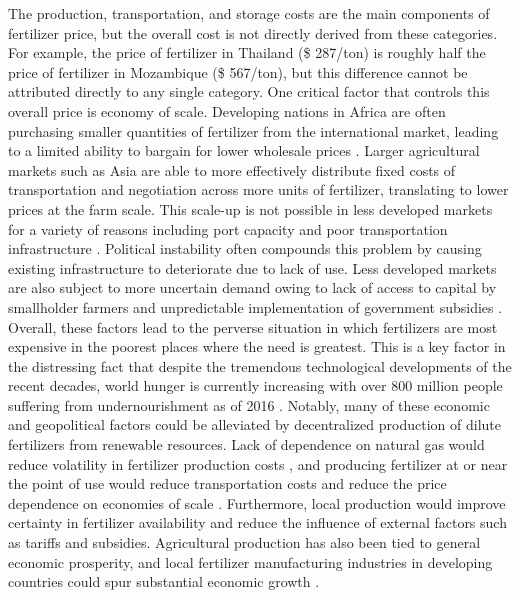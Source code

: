 The production, transportation, and storage costs are the main components of fertilizer price, but the overall cost is not directly derived from these categories. For example, the price of fertilizer in Thailand (\$ 287/ton) is roughly half the price of fertilizer in Mozambique (\$ 567/ton), but this difference cannot be attributed directly to any single category. One critical factor that controls this overall price is economy of scale. Developing nations in Africa are often purchasing smaller quantities of fertilizer from the international market, leading to a limited ability to bargain for lower wholesale prices \cite{Wanzala2013}. Larger agricultural markets such as Asia are able to more effectively distribute fixed costs of transportation and negotiation across more units of fertilizer, translating to lower prices at the farm scale. This scale-up is not possible in less developed markets for a variety of reasons including port capacity and poor transportation infrastructure \needcite. Political instability often compounds this problem by causing existing infrastructure to deteriorate due to lack of use\cite{Foster_2011}. Less developed markets are also subject to more uncertain demand owing to lack of access to capital by smallholder farmers and unpredictable implementation of government subsidies \needcite. Overall, these factors lead to the perverse situation in which fertilizers are most expensive in the poorest places where the need is greatest. This is a key factor in the distressing fact that despite the tremendous technological developments of the recent decades, world hunger is currently increasing with over 800 million people suffering from undernourishment as of 2016 \cite{FAO_2017}. Notably, many of these economic and geopolitical factors could be alleviated by decentralized production of dilute fertilizers from renewable resources. Lack of dependence on natural gas would reduce volatility in fertilizer production costs \cite{Etienne2016}, and producing fertilizer at or near the point of use would reduce transportation costs and reduce the price dependence on economies of scale  \cite{IFDC_1998}. Furthermore, local production would improve certainty in fertilizer availability and reduce the influence of external factors such as tariffs and subsidies. Agricultural production has also been tied to general economic prosperity, and local fertilizer manufacturing industries in developing countries could spur substantial economic growth \cite{McArthur_2017}.

